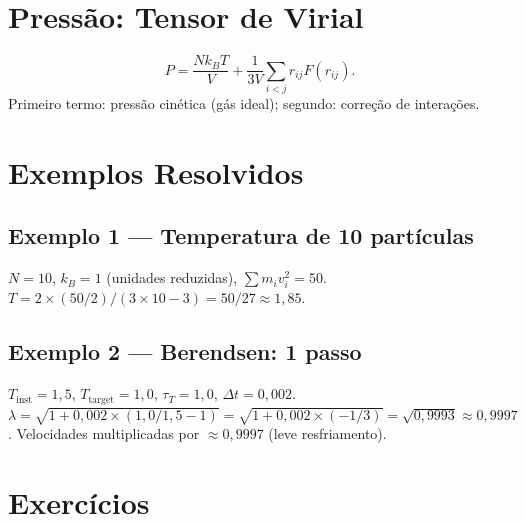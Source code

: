 \documentclass[12pt,a4paper]{article}
\begin{document}
\section*{Press\~ao: Tensor de Virial}

\[
P = \frac{Nk_BT}{V} + \frac{1}{3V}\sum_{i<j}r_{ij}F(r_{ij}).
\]
Primeiro termo: press\~ao cin\'etica (g\'as ideal); segundo: corre\c{c}\~ao de intera\c{c}\~oes.

\section*{Exemplos Resolvidos}

\subsection*{Exemplo 1 --- Temperatura de 10 part\'iculas}
$N=10$, $k_B=1$ (unidades reduzidas), $\sum m_iv_i^2 = 50$.
$T = 2\times(50/2)/(3\times10-3) = 50/27 \approx 1{,}85$.

\subsection*{Exemplo 2 --- Berendsen: 1 passo}
$T_\text{inst}=1{,}5$, $T_\text{target}=1{,}0$, $\tau_T=1{,}0$, $\Delta t=0{,}002$.
$\lambda = \sqrt{1 + 0{,}002\times(1{,}0/1{,}5-1)} = \sqrt{1 + 0{,}002\times(-1/3)} = \sqrt{0{,}9993} \approx 0{,}9997$.
Velocidades multiplicadas por $\approx 0{,}9997$ (leve resfriamento).

\section*{Exerc\'icios}
\end{document}
